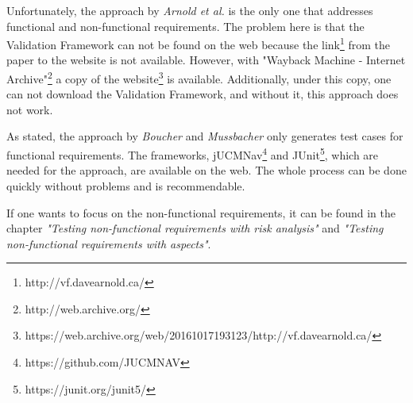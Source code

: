 Unfortunately, the approach by \textit{Arnold et al.} is the only one that addresses functional and non-functional requirements. The problem here is that the Validation Framework can not be found on the web because the link\footnote{http://vf.davearnold.ca/} from the paper to the website is not available. However, with "Wayback Machine - Internet Archive"\footnote{http://web.archive.org/} a copy of the website\footnote{https://web.archive.org/web/20161017193123/http://vf.davearnold.ca/} is available. Additionally, under this copy, one can not download the Validation Framework, and without it, this approach does not work.  

As stated, the approach by \textit{Boucher} and \textit{Mussbacher} only generates test cases for functional requirements. The frameworks, jUCMNav\footnote{https://github.com/JUCMNAV} and JUnit\footnote{https://junit.org/junit5/}, which are needed for the approach, are available on the web. The whole process can be done quickly without problems and is recommendable.

If one wants to focus on the non-functional requirements, it can be found in the chapter \textit{"Testing non-functional requirements with risk analysis"} and \textit{"Testing non-functional requirements with aspects"}.

